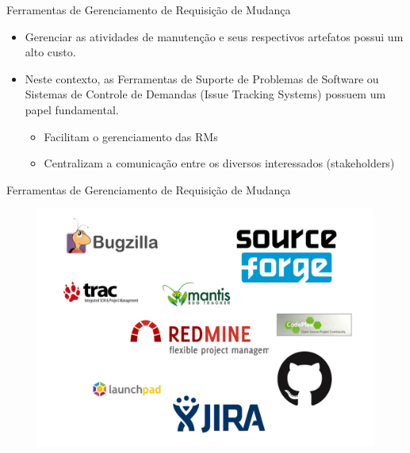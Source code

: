 \documentclass[t,14pt,mathserif]{beamer}
\begin{document}
\begin{frame}{Ferramentas de Gerenciamento de Requisição de Mudança}
	\begin{itemize}
        \item Gerenciar as atividades de manutenção e seus respectivos artefatos
            possui um alto custo.
        \item Neste contexto, as Ferramentas de Suporte de Problemas de Software
            ou Sistemas de Controle de Demandas (Issue Tracking Systems) possuem
            um papel fundamental.
			\begin{itemize}
				\item Facilitam o gerenciamento das RMs
                \item Centralizam a comunicação entre os diversos interessados
                    (stakeholders)
			\end{itemize}
	\end{itemize}
\end{frame}

\begin{frame}{Ferramentas de Gerenciamento de Requisição de Mudança}
		\begin{figure}[hbtp]
			\centering
			\includegraphics[scale=.3]{../img/issue-tracking-sytem.png}
		\end{figure}
    \end{frame}
\end{document}
